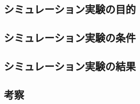
\subsection{シミュレーション実験の目的}

\subsection{シミュレーション実験の条件}

\subsection{シミュレーション実験の結果}

\subsection{考察}
